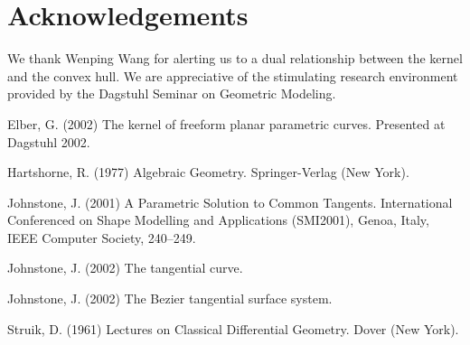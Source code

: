 \documentclass[12pt]{article}
\begin{document}





\section{Acknowledgements}

We thank Wenping Wang for alerting us to a dual relationship between the kernel
and the convex hull.
We are appreciative of the stimulating research environment provided by the Dagstuhl
Seminar on Geometric Modeling.


\begin{thebibliography}{Johnstone 02a}

Elber, G. (2002)
The kernel of freeform planar parametric curves.
Presented at Dagstuhl 2002.

Hartshorne, R. (1977) 
Algebraic Geometry.
Springer-Verlag (New York).

Johnstone, J. (2001)
A Parametric Solution to Common Tangents.
International Conferenced on Shape Modelling and Applications (SMI2001),
Genoa, Italy, IEEE Computer Society, 240--249.

Johnstone, J. (2002)
The tangential curve.

Johnstone, J. (2002)
The Bezier tangential surface system.

Struik, D. (1961)
Lectures on Classical Differential Geometry.
Dover (New York).

\end{thebibliography}
\end{document}
